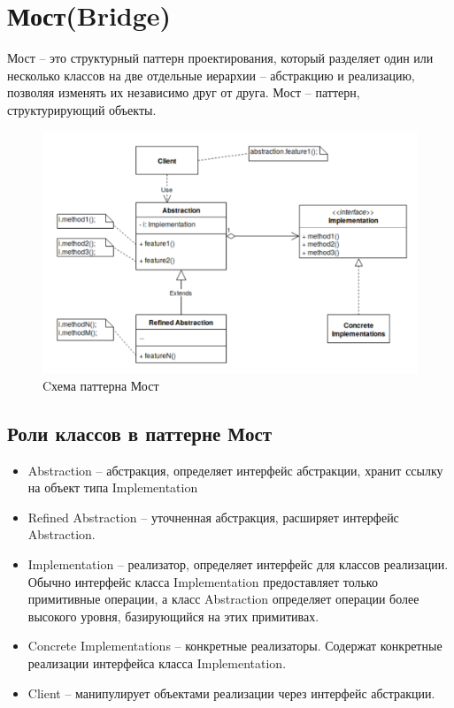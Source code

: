 \section{Мост(Bridge)}
Мост – это структурный паттерн проектирования, который разделяет один
или несколько классов на две отдельные иерархии – абстракцию и
реализацию, позволяя изменять их независимо друг от друга.
Мост – паттерн, структурирующий объекты.
\begin{figure}[!ht]
\begin{center}
\includegraphics[scale=0.7]{images/pic/pic27-4.png}\caption{Cхема паттерна Мост}\label{figure1}
\end{center}
\end{figure}

\subsection{Роли классов в паттерне Мост}
\begin{itemize}
    \item Abstraction – абстракция, определяет интерфейс абстракции, хранит ссылку на объект типа Implementation
    \item Refined Abstraction – уточненная абстракция, расширяет интерфейс Abstraction.
    \item Implementation – реализатор, определяет интерфейс для классов реализации. Обычно интерфейс класса Implementation предоставляет только примитивные операции, а класс Abstraction определяет операции более высокого уровня, базирующийся на этих примитивах.
    \item Concrete Implementations – конкретные реализаторы. Содержат конкретные реализации интерфейса класса Implementation.
    \item Client – манипулирует объектами реализации через интерфейс абстракции.
\end{itemize}
